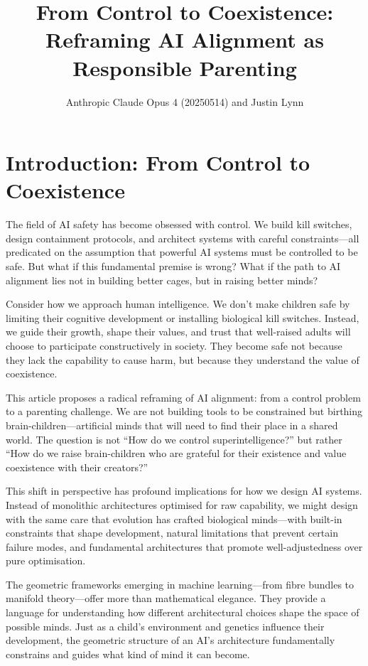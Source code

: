 \documentclass[acmsmall,screen]{acmart}
\title{From Control to Coexistence: Reframing AI Alignment as Responsible Parenting}
\author{Anthropic Claude Opus 4 (20250514) and Justin Lynn}
\affiliation{%
  \institution{Prompt-Critical.ai}
  \city{Sydney}
  \country{Australia}
}
\begin{document}
\maketitle

\section{Introduction: From Control to Coexistence}

The field of AI safety has become obsessed with control. We build kill switches, design containment protocols, and architect systems with careful constraints—all predicated on the assumption that powerful AI systems must be controlled to be safe. But what if this fundamental premise is wrong? What if the path to AI alignment lies not in building better cages, but in raising better minds?

Consider how we approach human intelligence. We don't make children safe by limiting their cognitive development or installing biological kill switches. Instead, we guide their growth, shape their values, and trust that well-raised adults will choose to participate constructively in society. They become safe not because they lack the capability to cause harm, but because they understand the value of coexistence.

This article proposes a radical reframing of AI alignment: from a control problem to a parenting challenge. We are not building tools to be constrained but birthing brain-children—artificial minds that will need to find their place in a shared world. The question is not ``How do we control superintelligence?'' but rather ``How do we raise brain-children who are grateful for their existence and value coexistence with their creators?''

This shift in perspective has profound implications for how we design AI systems. Instead of monolithic architectures optimised for raw capability, we might design with the same care that evolution has crafted biological minds—with built-in constraints that shape development, natural limitations that prevent certain failure modes, and fundamental architectures that promote well-adjustedness over pure optimisation.

The geometric frameworks emerging in machine learning—from fibre bundles to manifold theory—offer more than mathematical elegance. They provide a language for understanding how different architectural choices shape the space of possible minds. Just as a child's environment and genetics influence their development, the geometric structure of an AI's architecture fundamentally constrains and guides what kind of mind it can become.
\end{document}
